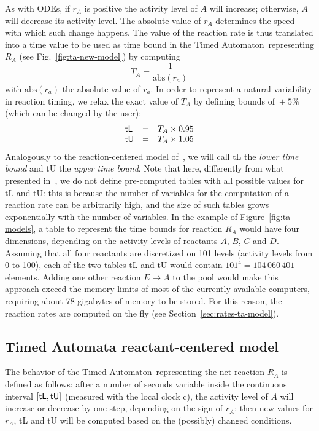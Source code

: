 \documentclass{llncs}
\newcommand{\ta}{Timed Automaton}
\begin{document}
As with ODEs, if $r_A$ is positive the activity level of $A$ will increase;
otherwise, $A$ will decrease its activity level.
The absolute value of $r_A$ determines the speed with which such change happens.
The value of the reaction rate is thus translated into a time value to be used as
time bound in the \ta\ representing $R_A$ (see Fig.~\ref{fig:ta-new-model}) by computing
$$T_A = \frac{1}{\mbox{abs}(r_a)}$$
with $\mbox{abs}(r_a)$ the absolute value of $r_a$. In order to represent
a natural variability in reaction timing, we relax the exact value of $T_A$ by
defining bounds of~$\pm~5\%$ (which can be changed by the user):
$$
\begin{array}{lcl}
  \mbox{\sf tL} &=& T_A \times 0.95 \\
  \mbox{\sf tU} &=& T_A \times 1.05
\end{array}
$$
Analogously to the reaction-centered model of~\cite{animo-ieee},
we will call {\sf tL} the \emph{lower time bound} and {\sf tU} the \emph{upper time bound}.
Note that here, differently from what presented in~\cite{animo-ieee}, we do not define
pre-computed tables with all possible values for {\sf tL} and {\sf tU}: this is because
the number of variables for the computation of a reaction rate can be arbitrarily high, and
the size of such tables grows exponentially with the number of variables.
In the example of Figure~\ref{fig:ta-models}, a table to represent the time bounds
for reaction ${R_A}$ would have four dimensions, depending on the activity levels
of reactants $A$, $B$, $C$ and $D$. Assuming that all four reactants are discretized
on 101 levels (activity levels from 0 to 100), each of the two tables {\sf tL} and {\sf tU} would contain $101^4 = 104\,060\,401$
elements. Adding one other reaction $E \rightarrow A$ to the pool would make
this approach exceed the memory limits of most of the currently available computers, requiring about 78 gigabytes of memory
to be stored. For this reason, the reaction rates are computed on the fly (see Section~\ref{sec:rates-ta-model}).


\subsection{Timed Automata reactant-centered model}\label{sec:ta-model}
The behavior of the \ta\ representing the net reaction $R_A$ is defined as follows: after a number of seconds
variable inside the continuous interval $[\mbox{\sf tL}, \mbox{\sf tU}]$ (measured with the local clock {\sf c}),
the activity level of $A$ will increase or
decrease by one step, depending on the sign of $r_A$; then new values for $r_A$, {\sf tL} and {\sf tU} will be computed based
on the (possibly) changed conditions.
\end{document}
